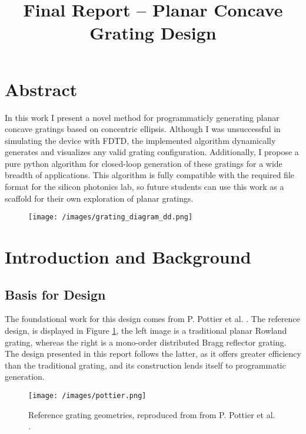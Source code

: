 \documentclass{article}
\title{Final Report -- Planar Concave Grating Design}
\begin{document}
\maketitle

\thispagestyle{empty}
\tableofcontents
\newpage
\setcounter{page}{1}

\section{Abstract}
In this work I present a novel method for programmaticly generating planar concave gratings based on concentric ellipsis. Although I was unsuccessful in simulating the device with FDTD, the implemented algorithm dynamically generates and visualizes any valid grating configuration. Additionally, I propose a pure python algorithm for closed-loop generation of these gratings for a wide breadth of applications. This algorithm is fully compatible with the required file format for the silicon photonics lab, so future students can use this work as a scaffold for their own exploration of planar gratings.

\begin{figure}[H]
\centering
\large 
\def\svgwidth{0.8 \textwidth}
\colorbox{white}{\texttt{[image: /images/grating\_diagram\_dd.png]}}
\end{figure}

\newpage

\section{Introduction and Background}

\subsection{Basis for Design}
The foundational work for this design comes from P. Pottier et al. \cite{Packirisamy2012Mono-OrderGrating}. The reference design, is displayed in Figure \ref{fig:pot_ref}, the left image is a traditional planar Rowland grating, whereas the right is a mono-order distributed Bragg reflector grating. The design presented in this report follows the latter, as it offers greater efficiency than the traditional grating, and its construction lends itself to programmatic generation. 

\begin{figure}[H]        
\centering
\scriptsize 
\texttt{[image: /images/pottier.png]}
\caption{\label{fig:pot_ref} Reference grating geometries, reproduced from from P. Pottier et al. \cite{Packirisamy2012Mono-OrderGrating}.}
\end{figure}
\end{document}
